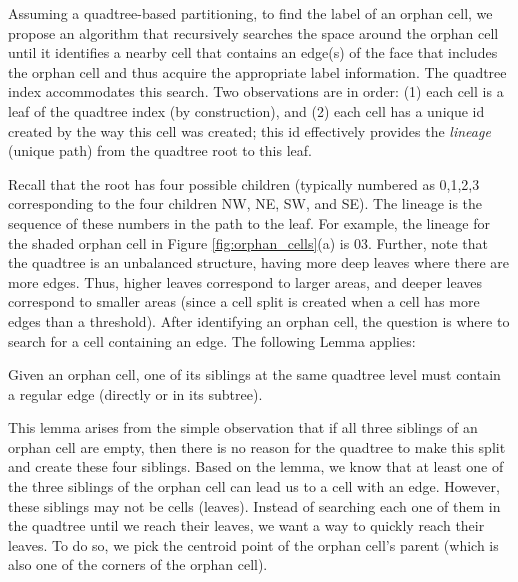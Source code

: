 

Assuming a quadtree-based partitioning, to find the label of an orphan cell, we propose an algorithm that recursively searches the space around the orphan cell until it identifies a nearby cell that contains an edge(s) of the face that includes the orphan cell and thus acquire the appropriate label information. The quadtree index accommodates this search. Two observations are in order: (1) each cell is a leaf of the quadtree index (by construction), and (2) each cell has a unique id created by the way this cell was created; this id effectively provides the \textit{lineage} (unique path) from the quadtree root to this leaf.

Recall that the root has four possible children (typically numbered as 0,1,2,3 corresponding to the four children NW, NE, SW, and SE). The lineage is the sequence of these numbers in the path to the leaf. For example, the lineage for the shaded orphan cell in Figure \ref{fig:orphan_cells}(a) is 03. Further, note that the quadtree is an unbalanced structure, having more deep leaves where there are more edges. Thus, higher leaves correspond to larger areas, and deeper leaves correspond to smaller areas (since a cell split is created when a cell has more edges than a threshold). After identifying an orphan cell, the question is where to search for a cell containing an edge. The following Lemma applies:

\begin{lemma}\label{lem:cells}
Given an orphan cell, one of its siblings at the same quadtree level must contain a regular edge (directly or in its subtree). 
\end{lemma}

This lemma arises from the simple observation that if all three siblings of an orphan cell are empty, then there is no reason for the quadtree to make this split and create these four siblings. Based on the lemma, we know that at least one of the three siblings of the orphan cell can lead us to a cell with an edge. 
However, these siblings may not be cells (leaves). Instead of searching each one of them in the quadtree until we reach their leaves, we want a way to quickly reach their leaves. To do so, we pick the centroid point of the orphan cell's parent (which is also one of the corners of the orphan cell). 

